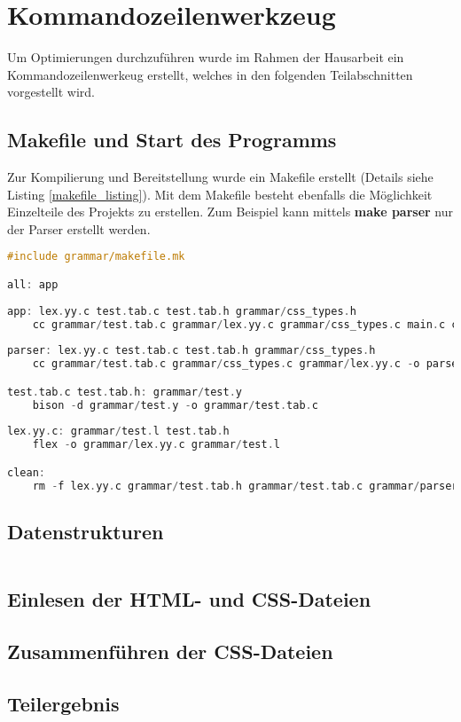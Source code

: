 \section{Kommandozeilenwerkzeug}
Um Optimierungen durchzuführen wurde im Rahmen der Hausarbeit ein Kommandozeilenwerkeug erstellt, welches in den folgenden Teilabschnitten vorgestellt wird.

\subsection{Makefile und Start des Programms}
Zur Kompilierung und Bereitstellung wurde ein Makefile erstellt (Details siehe Listing \ref{makefile_listing}). Mit dem Makefile besteht ebenfalls die Möglichkeit Einzelteile des Projekts zu erstellen. Zum Beispiel kann mittels \textbf{make parser} nur der Parser erstellt werden.
\begin{lstlisting}[label=makefile_listing,language=C, caption=Makefile]
#include grammar/makefile.mk

all: app
	
app: lex.yy.c test.tab.c test.tab.h grammar/css_types.h
	cc grammar/test.tab.c grammar/lex.yy.c grammar/css_types.c main.c cli_parse.c css_merge.c guiCSS.c optimizer.c output.c -lncurses -o optimCSS
	
parser: lex.yy.c test.tab.c test.tab.h grammar/css_types.h
	cc grammar/test.tab.c grammar/css_types.c grammar/lex.yy.c -o parser

test.tab.c test.tab.h: grammar/test.y
	bison -d grammar/test.y -o grammar/test.tab.c
            
lex.yy.c: grammar/test.l test.tab.h
	flex -o grammar/lex.yy.c grammar/test.l

clean: 
	rm -f lex.yy.c grammar/test.tab.h grammar/test.tab.c grammar/parser optimCSS
\end{lstlisting}

\subsection{Datenstrukturen}

\begin{lstlisting}[label=datastructures_listing,language=C, caption=Datenstrukturen]

\end{lstlisting}

\subsection{Einlesen der HTML- und CSS-Dateien}

\subsection{Zusammenführen der CSS-Dateien}

\subsection{Teilergebnis}

